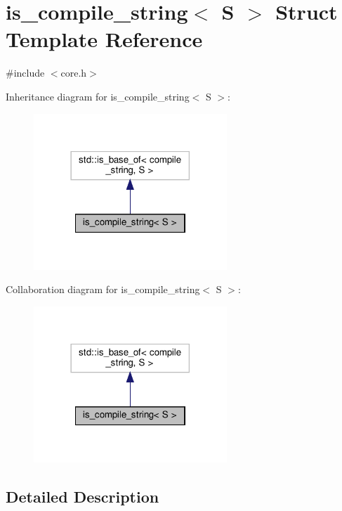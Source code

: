 \hypertarget{structis__compile__string}{}\section{is\+\_\+compile\+\_\+string$<$ S $>$ Struct Template Reference}
\label{structis__compile__string}


{\ttfamily \#include $<$core.\+h$>$}



Inheritance diagram for is\+\_\+compile\+\_\+string$<$ S $>$\+:
\nopagebreak
\begin{figure}[H]
\begin{center}
\leavevmode
\includegraphics[width=206pt]{structis__compile__string__inherit__graph}
\end{center}
\end{figure}


Collaboration diagram for is\+\_\+compile\+\_\+string$<$ S $>$\+:
\nopagebreak
\begin{figure}[H]
\begin{center}
\leavevmode
\includegraphics[width=206pt]{structis__compile__string__coll__graph}
\end{center}
\end{figure}


\subsection{Detailed Description}
